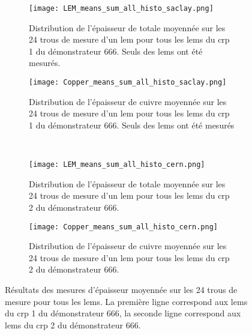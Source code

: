                \begin{figure}[htpb]
                    \begin{subfigure}[t]{0.48\textwidth}
                        \texttt{[image: LEM\_means\_sum\_all\_histo\_saclay.png]}
                        \caption{Distribution de l'épaisseur de totale moyennée sur les 24 trous de mesure d'un \gls{lem} pour tous les \glspl{lem} du \gls{crp} 1 du démonstrateur 666. Seuls  des  \glspl{lem} ont été mesurés.}
                        \label{fig::distri_moyenne_lem_saclay}
                    \end{subfigure}
                    \hfill
                    \begin{subfigure}[t]{0.48\textwidth}
                        \texttt{[image: Copper\_means\_sum\_all\_histo\_saclay.png]}
                        \caption{Distribution de l'épaisseur de cuivre moyennée sur les 24 trous de mesure d'un \gls{lem} pour tous les \glspl{lem} du \gls{crp} 1 du démonstrateur 666. Seuls  des  \glspl{lem} ont été mesurés}
                        \label{fig::distri_moyenne_cuivre_saclay}
                    \end{subfigure}\\
                    \begin{subfigure}[b]{0.48\textwidth}
                        \texttt{[image: LEM\_means\_sum\_all\_histo\_cern.png]}
                        \caption{Distribution de l'épaisseur de totale moyennée sur les 24 trous de mesure d'un \gls{lem} pour tous les \glspl{lem} du \gls{crp} 2 du démonstrateur 666.}
                        \label{fig::distri_moyenne_lem_cern}
                    \end{subfigure}
                    \hfill
                    \begin{subfigure}[b]{0.48\textwidth}
                        \texttt{[image: Copper\_means\_sum\_all\_histo\_cern.png]}
                        \caption{Distribution de l'épaisseur de cuivre moyennée sur les 24 trous de mesure d'un \gls{lem} pour tous les \glspl{lem} du \gls{crp} 2 du démonstrateur 666.}
                        \label{fig::distri_moyenne_cuivre_cern}
                    \end{subfigure}
                    \caption[Résultats des mesures d'épaisseurs moyennées sur les 24 trous de mesure pour tous les \glspl{lem}.]{Résultats des mesures d'épaisseur moyennée sur les 24 trous de mesure pour tous les \glspl{lem}. La première ligne correspond aux \glspl{lem} du \gls{crp} 1 du démonstrateur 666, la seconde ligne correspond aux \glspl{lem} du \gls{crp} 2 du démonstrateur 666.}
                    \label{fig::epaisseur_moyenne_tous_lem}
                \end{figure}
            
